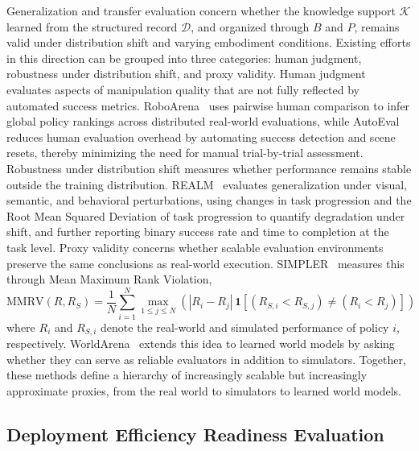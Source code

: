 \documentclass[acmsmall,screen,review]{acmart}
\begin{document}
Generalization and transfer evaluation concern whether the knowledge support \(\mathcal{K}\) learned from the structured record \(\mathcal{D}\), and organized through \(B\) and \(P\), remains valid under distribution shift and varying embodiment conditions. Existing efforts in this direction can be grouped into three categories: human judgment, robustness under distribution shift, and proxy validity.
Human judgment evaluates aspects of manipulation quality that are not fully reflected by automated success metrics. 
RoboArena~\cite{atreya2025roboarena} uses pairwise human comparison to infer global policy rankings across distributed real-world evaluations, 
while AutoEval~\cite{zhou2025autoeval} reduces human evaluation overhead by automating success detection and scene resets, thereby minimizing the need for manual trial-by-trial assessment.
Robustness under distribution shift measures whether performance remains stable outside the training distribution. 
REALM~\cite{sedlacek2025realm} evaluates generalization under visual, semantic, and behavioral perturbations, using changes in task progression and the Root Mean Squared Deviation of task progression to quantify degradation under shift, and further reporting binary success rate and time to completion at the task level.
Proxy validity concerns whether scalable evaluation environments preserve the same conclusions as real-world execution. SIMPLER~\cite{li2025simpler} measures this through Mean Maximum Rank Violation,
\begin{equation}
\mathrm{MMRV}(R, R_S)
=
\frac{1}{N}
\sum_{i=1}^{N}
\max_{1 \le j \le N}
\left(
|R_i - R_j|\,
\mathbf{1}\!\left[(R_{S,i} < R_{S,j}) \ne (R_i < R_j)\right]
\right)
\end{equation}
where \(R_i\) and \(R_{S,i}\) denote the real-world and simulated performance of policy \(i\), respectively.
WorldArena~\cite{shang2026worldarena} extends this idea to learned world models by asking whether they can serve as reliable evaluators in addition to simulators. 
Together, these methods define a hierarchy of increasingly scalable but increasingly approximate proxies, from the real world to simulators to learned world models.

\subsection{Deployment Efficiency Readiness Evaluation}\label{sec:eval_energy}
\end{document}
